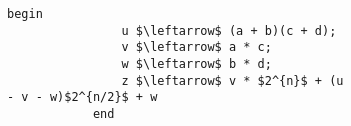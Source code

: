 \documentclass{subfiles}
\begin{document}
\begin{figure}[!h]
    \centering
    \begin{subfigure}[b]{0.5\textwidth}
        \begin{lstlisting}[language = algol]
            begin
                u $\leftarrow$ (a + b)(c + d);
                v $\leftarrow$ a * c;
                w $\leftarrow$ b * d;
                z $\leftarrow$ v * $2^{n}$ + (u - v - w)$2^{n/2}$ + w
            end
        \end{lstlisting}
    \end{subfigure}
\end{figure}
\end{document}
